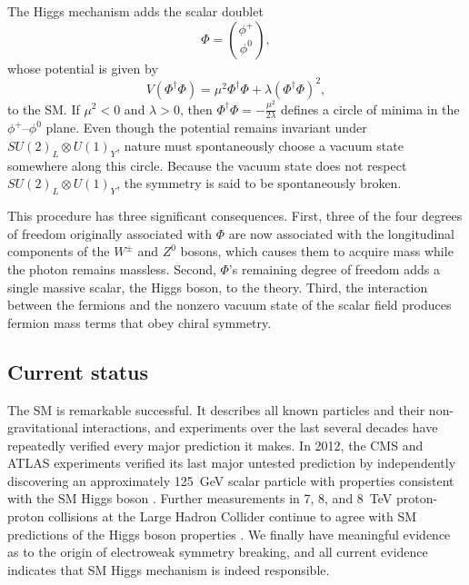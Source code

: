 The Higgs mechanism adds the scalar doublet
\begin{equation}
    \Phi = \binom{\phi^{+}}{\phi^{0}},
\end{equation}
whose potential is given by
\begin{equation}
    V(\Phi^{\dagger}\Phi) = \mu^{2}\Phi^{\dagger}\Phi + \lambda(\Phi^{\dagger}\Phi)^{2},
\end{equation}
to the SM. If $\mu^{2}<0$ and $\lambda>0$, then $\Phi^{\dagger}\Phi = -\frac{\mu^{2}}{2\lambda}$ defines a circle of minima in the $\phi^{+}$--$\phi^{0}$ plane. Even though the potential remains invariant under $SU(2)_{L} \otimes U(1)_{Y}$, nature must spontaneously choose a vacuum state somewhere along this circle. Because the vacuum state does not respect $SU(2)_{L} \otimes U(1)_{Y}$, the symmetry is said to be spontaneously broken.

This procedure has three significant consequences. First, three of the four degrees of freedom originally associated with $\Phi$ are now associated with the longitudinal components of the $W^{\pm}$ and $Z^{0}$ bosons, which causes them to acquire mass while the photon remains massless. Second, $\Phi$'s remaining degree of freedom adds a single massive scalar, the Higgs boson, to the theory. Third, the interaction between the fermions and the nonzero vacuum state of the scalar field produces fermion mass terms that obey chiral symmetry.


\subsection{Current status}
\label{sm_status}
The SM is remarkable successful. It describes all known particles and their non-gravitational interactions, and experiments over the last several decades have repeatedly verified every major prediction it makes. In 2012, the CMS and ATLAS experiments verified its last major untested prediction by independently discovering an approximately \SI{125}{\GeV} scalar particle with properties consistent with the SM Higgs boson \cite{cms_higgs, atlas_higgs}. Further measurements in \num{7}, \num{8}, and \SI{8}{\TeV} proton-proton collisions at the Large Hadron Collider continue to agree with SM predictions of the Higgs boson properties . We finally have meaningful evidence as to the origin of electroweak symmetry breaking, and all current evidence indicates that SM Higgs mechanism is indeed responsible.


